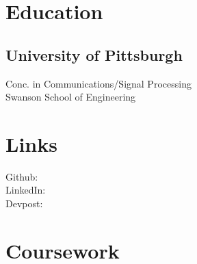 \documentclass[]{deedy-resume-openfont}
\begin{document}
%
%

%
%



%
%

\begin{minipage}[t]{0.33\textwidth} 


\section{Education} 

\subsection{University of Pittsburgh}
Conc. in Communications/Signal Processing \\
Swanson School of Engineering \\
\sectionsep


\section{Links} 
Github: \href{https://github.com/mike-u}{} \\
LinkedIn:  \href{https://www.linkedin.com/in/mikeurich}{} \\
Devpost:  \href{http://devpost.com/MikeUrich}{}
\sectionsep


\section{Coursework}


\end{minipage}
\end{document}
